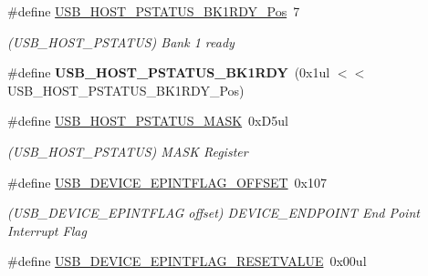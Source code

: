 \begin{DoxyCompactItemize}
\item 
\hypertarget{group___s_a_m_l21___u_s_b_ga139b1a9ed8cd1f5097a1e76fc790d123}{}\#define \hyperlink{group___s_a_m_l21___u_s_b_ga139b1a9ed8cd1f5097a1e76fc790d123}{U\+S\+B\+\_\+\+H\+O\+S\+T\+\_\+\+P\+S\+T\+A\+T\+U\+S\+\_\+\+B\+K1\+R\+D\+Y\+\_\+\+Pos}~7\label{group___s_a_m_l21___u_s_b_ga139b1a9ed8cd1f5097a1e76fc790d123}

\begin{DoxyCompactList}\small\item\em (U\+S\+B\+\_\+\+H\+O\+S\+T\+\_\+\+P\+S\+T\+A\+T\+U\+S) Bank 1 ready \end{DoxyCompactList}\item 
\hypertarget{group___s_a_m_l21___u_s_b_ga4e660eab9f6f85241d454f01d0f98fb4}{}\#define {\bfseries U\+S\+B\+\_\+\+H\+O\+S\+T\+\_\+\+P\+S\+T\+A\+T\+U\+S\+\_\+\+B\+K1\+R\+D\+Y}~(0x1ul $<$$<$ U\+S\+B\+\_\+\+H\+O\+S\+T\+\_\+\+P\+S\+T\+A\+T\+U\+S\+\_\+\+B\+K1\+R\+D\+Y\+\_\+\+Pos)\label{group___s_a_m_l21___u_s_b_ga4e660eab9f6f85241d454f01d0f98fb4}

\item 
\hypertarget{group___s_a_m_l21___u_s_b_ga564ffd7778a4c3e18007fac35b0eb429}{}\#define \hyperlink{group___s_a_m_l21___u_s_b_ga564ffd7778a4c3e18007fac35b0eb429}{U\+S\+B\+\_\+\+H\+O\+S\+T\+\_\+\+P\+S\+T\+A\+T\+U\+S\+\_\+\+M\+A\+S\+K}~0x\+D5ul\label{group___s_a_m_l21___u_s_b_ga564ffd7778a4c3e18007fac35b0eb429}

\begin{DoxyCompactList}\small\item\em (U\+S\+B\+\_\+\+H\+O\+S\+T\+\_\+\+P\+S\+T\+A\+T\+U\+S) M\+A\+S\+K Register \end{DoxyCompactList}\item 
\hypertarget{group___s_a_m_l21___u_s_b_gaf2b8aae58f8153bdedd8c97bdcc6dba7}{}\#define \hyperlink{group___s_a_m_l21___u_s_b_gaf2b8aae58f8153bdedd8c97bdcc6dba7}{U\+S\+B\+\_\+\+D\+E\+V\+I\+C\+E\+\_\+\+E\+P\+I\+N\+T\+F\+L\+A\+G\+\_\+\+O\+F\+F\+S\+E\+T}~0x107\label{group___s_a_m_l21___u_s_b_gaf2b8aae58f8153bdedd8c97bdcc6dba7}

\begin{DoxyCompactList}\small\item\em (U\+S\+B\+\_\+\+D\+E\+V\+I\+C\+E\+\_\+\+E\+P\+I\+N\+T\+F\+L\+A\+G offset) D\+E\+V\+I\+C\+E\+\_\+\+E\+N\+D\+P\+O\+I\+N\+T End Point Interrupt Flag \end{DoxyCompactList}\item 
\hypertarget{group___s_a_m_l21___u_s_b_ga4f7654b8c508d90ed26d64adfde527cd}{}\#define \hyperlink{group___s_a_m_l21___u_s_b_ga4f7654b8c508d90ed26d64adfde527cd}{U\+S\+B\+\_\+\+D\+E\+V\+I\+C\+E\+\_\+\+E\+P\+I\+N\+T\+F\+L\+A\+G\+\_\+\+R\+E\+S\+E\+T\+V\+A\+L\+U\+E}~0x00ul\label{group___s_a_m_l21___u_s_b_ga4f7654b8c508d90ed26d64adfde527cd}


\end{DoxyCompactItemize}
